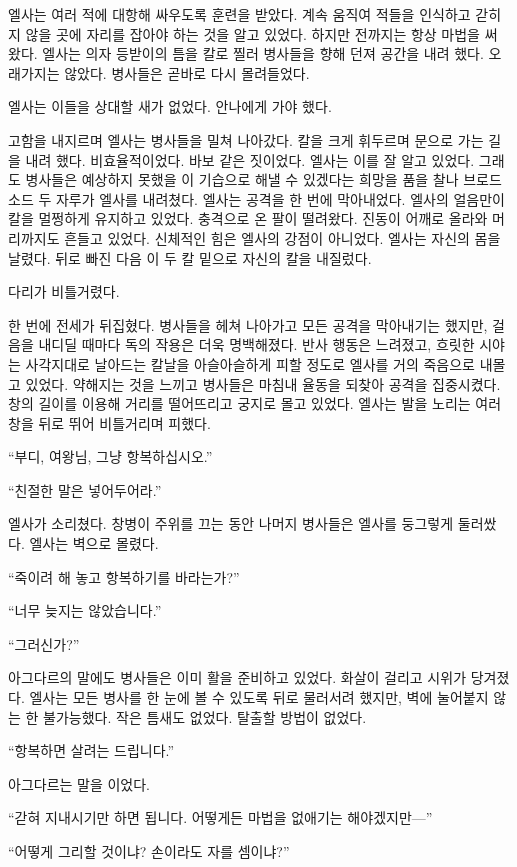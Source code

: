 엘사는 여러 적에 대항해 싸우도록 훈련을 받았다. 계속 움직여 적들을 인식하고 갇히지 않을 곳에 자리를 잡아야 하는 것을 알고 있었다. 하지만 전까지는 항상 마법을 써 왔다. 엘사는 의자 등받이의 틈을 칼로 찔러 병사들을 향해 던져 공간을 내려 했다. 오래가지는 않았다. 병사들은 곧바로 다시 몰려들었다.

엘사는 이들을 상대할 새가 없었다. 안나에게 가야 했다.

고함을 내지르며 엘사는 병사들을 밀쳐 나아갔다. 칼을 크게 휘두르며 문으로 가는 길을 내려 했다. 비효율적이었다. 바보 같은 짓이었다. 엘사는 이를 잘 알고 있었다. 그래도 병사들은 예상하지 못했을 이 기습으로 해낼 수 있겠다는 희망을 품을 찰나 브로드소드 두 자루가 엘사를 내려쳤다. 엘사는 공격을 한 번에 막아내었다. 엘사의 얼음만이 칼을 멀쩡하게 유지하고 있었다. 충격으로 온 팔이 떨려왔다. 진동이 어깨로 올라와 머리까지도 흔들고 있었다. 신체적인 힘은 엘사의 강점이 아니었다. 엘사는 자신의 몸을 날렸다. 뒤로 빠진 다음 이 두 칼 밑으로 자신의 칼을 내질렀다.

다리가 비틀거렸다.

한 번에 전세가 뒤집혔다. 병사들을 헤쳐 나아가고 모든 공격을 막아내기는 했지만, 걸음을 내디딜 때마다 독의 작용은 더욱 명백해졌다. 반사 행동은 느려졌고, 흐릿한 시야는 사각지대로 날아드는 칼날을 아슬아슬하게 피할 정도로 엘사를 거의 죽음으로 내몰고 있었다. 약해지는 것을 느끼고 병사들은 마침내 율동을 되찾아 공격을 집중시켰다. 창의 길이를 이용해 거리를 떨어뜨리고 궁지로 몰고 있었다. 엘사는 발을 노리는 여러 창을 뒤로 뛰어 비틀거리며 피했다.

``부디, 여왕님, 그냥 항복하십시오.''

``친절한 말은 넣어두어라.''

엘사가 소리쳤다. 창병이 주위를 끄는 동안 나머지 병사들은 엘사를 둥그렇게 둘러쌌다. 엘사는 벽으로 몰렸다.

``죽이려 해 놓고 항복하기를 바라는가?''

``너무 늦지는 않았습니다.''

``그러신가?''

아그다르의 말에도 병사들은 이미 활을 준비하고 있었다. 화살이 걸리고 시위가 당겨졌다. 엘사는 모든 병사를 한 눈에 볼 수 있도록 뒤로 물러서려 했지만, 벽에 눌어붙지 않는 한 불가능했다. 작은 틈새도 없었다. 탈출할 방법이 없었다.

``항복하면 살려는 드립니다.''

아그다르는 말을 이었다.

``갇혀 지내시기만 하면 됩니다. 어떻게든 마법을 없애기는 해야겠지만—''

``어떻게 그리할 것이냐? 손이라도 자를 셈이냐?''


